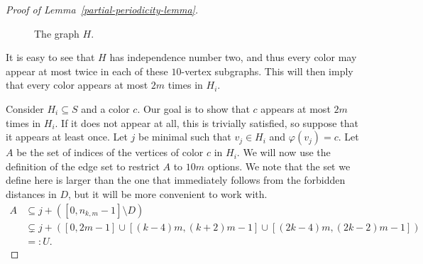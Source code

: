 \documentclass[a4paper,10pt,hidelinks]{amsart}
\newenvironment{claimproof}[1][\proofname]{\proof[#1]\renewcommand{\qedsymbol}{$\blacksquare$}}{\endproof}
\theoremstyle{definition}
\begin{document}
\begin{proof}[Proof of Lemma~\ref{partial-periodicity-lemma}]
\begin{claimproof}
        \begin{figure}[ht]
            \centering
        \caption{The graph $H$.}\label{fig:H}
        \end{figure}

        It is easy to see that $H$ has independence number two, and thus every color may appear at most twice in each of these $10$-vertex subgraphs. This will then imply that every color appears at most $2m$ times in $H_i$.

        Consider $H_i \subseteq S$ and a color $c$. Our goal is to show that $c$ appears at most $2m$ times in $H_i$. If it does not appear at all, this is trivially satisfied, so suppose that it appears at least once. Let $j$ be minimal such that $v_j \in H_i$ and $\varphi(v_j) = c$. Let $A$ be the set of indices of the vertices of color $c$ in $H_i$. We will now use the definition of the edge set to restrict $A$ to $10m$ options. We note that the set we define here is larger than the one that immediately follows from the forbidden distances in $D$, but it will be more convenient to work with.
        \begin{align*}
            A &\subseteq j + ([0, n_{k,m} - 1] \setminus D)\\
            &\subsetneq j + ([0, 2m - 1] \cup [(k-4)m, (k+2)m-1] \cup [(2k - 4)m, (2k - 2)m - 1])\\ &=: U.
        \end{align*}


\end{claimproof}
\end{proof}
\end{document}
